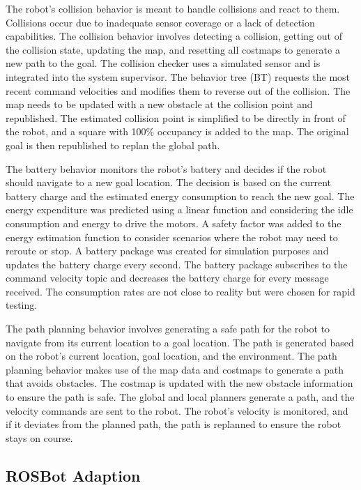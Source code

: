 \documentclass[letterpaper, 10pt, conference]{ieeeconf}
\begin{document}
The robot's collision behavior is meant to handle collisions and react to them. Collisions occur due to inadequate sensor coverage or a lack of detection capabilities. The collision behavior involves detecting a collision, getting out of the collision state, updating the map, and resetting all costmaps to generate a new path to the goal. The collision checker uses a simulated sensor and is integrated into the system supervisor. The behavior tree (BT) requests the most recent command velocities and modifies them to reverse out of the collision. The map needs to be updated with a new obstacle at the collision point and republished. The estimated collision point is simplified to be directly in front of the robot, and a square with 100\% occupancy is added to the map. The original goal is then republished to replan the global path.

The battery behavior monitors the robot's battery and decides if the robot should navigate to a new goal location. The decision is based on the current battery charge and the estimated energy consumption to reach the new goal. The energy expenditure was predicted using a linear function and considering the idle consumption and energy to drive the motors. A safety factor was added to the energy estimation function to consider scenarios where the robot may need to reroute or stop. A battery package was created for simulation purposes and updates the battery charge every second. The battery package subscribes to the command velocity topic and decreases the battery charge for every message received. The consumption rates are not close to reality but were chosen for rapid testing.

The path planning behavior involves generating a safe path for the robot to navigate from its current location to a goal location. The path is generated based on the robot's current location, goal location, and the environment. The path planning behavior makes use of the map data and costmaps to generate a path that avoids obstacles. The costmap is updated with the new obstacle information to ensure the path is safe. The global and local planners generate a path, and the velocity commands are sent to the robot. The robot's velocity is monitored, and if it deviates from the planned path, the path is replanned to ensure the robot stays on course.

\subsection{ROSBot Adaption}
\end{document}
